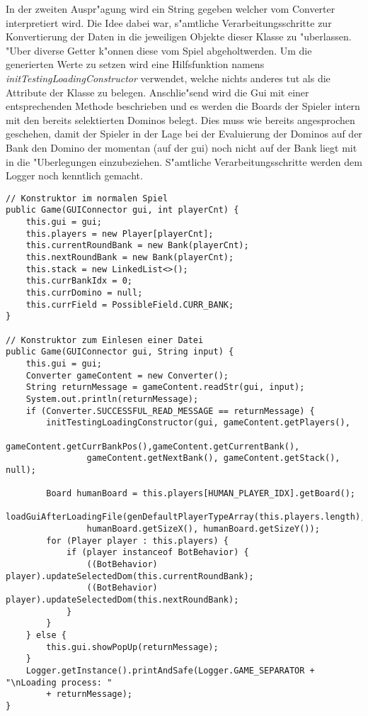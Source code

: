 In der zweiten Auspr"agung wird ein String gegeben welcher vom Converter interpretiert wird. Die Idee dabei war, s"amtliche Verarbeitungsschritte zur Konvertierung der Daten in die jeweiligen Objekte dieser Klasse zu "uberlassen. "Uber diverse Getter k"onnen diese vom Spiel \grqq abgeholt\glqq  werden. Um die generierten Werte zu setzen wird eine Hilfsfunktion namens \emph{initTestingLoadingConstructor} verwendet, welche nichts anderes tut als die Attribute der Klasse zu belegen. Anschlie"send wird die Gui mit einer entsprechenden Methode beschrieben und es werden die Boards der Spieler intern mit den bereits selektierten Dominos belegt. Dies muss wie bereits angesprochen geschehen, damit der Spieler in der Lage bei der Evaluierung der Dominos auf der Bank den Domino der momentan (auf der gui) noch nicht auf der Bank liegt mit in die "Uberlegungen einzubeziehen. 
S"amtliche Verarbeitungsschritte werden dem Logger noch kenntlich gemacht. 
\begin{lstlisting}[float,style=CodeHighlighting,caption=Game - Konstruktoren,label=game_konstruktor]
// Konstruktor im normalen Spiel
public Game(GUIConnector gui, int playerCnt) {
    this.gui = gui;
    this.players = new Player[playerCnt];
    this.currentRoundBank = new Bank(playerCnt);
    this.nextRoundBank = new Bank(playerCnt);
    this.stack = new LinkedList<>();
    this.currBankIdx = 0;
    this.currDomino = null;
    this.currField = PossibleField.CURR_BANK;
}

// Konstruktor zum Einlesen einer Datei
public Game(GUIConnector gui, String input) {
    this.gui = gui;
    Converter gameContent = new Converter();
    String returnMessage = gameContent.readStr(gui, input);
    System.out.println(returnMessage);
    if (Converter.SUCCESSFUL_READ_MESSAGE == returnMessage) {
        initTestingLoadingConstructor(gui, gameContent.getPlayers(),
        		gameContent.getCurrBankPos(),gameContent.getCurrentBank(),
                gameContent.getNextBank(), gameContent.getStack(), null);

        Board humanBoard = this.players[HUMAN_PLAYER_IDX].getBoard();
        loadGuiAfterLoadingFile(genDefaultPlayerTypeArray(this.players.length),
        		humanBoard.getSizeX(), humanBoard.getSizeY());
        for (Player player : this.players) {
            if (player instanceof BotBehavior) {
                ((BotBehavior) player).updateSelectedDom(this.currentRoundBank);
                ((BotBehavior) player).updateSelectedDom(this.nextRoundBank);
            }
        }
    } else {
        this.gui.showPopUp(returnMessage);
    }
    Logger.getInstance().printAndSafe(Logger.GAME_SEPARATOR + "\nLoading process: " 
    	+ returnMessage);
}
\end{lstlisting}

